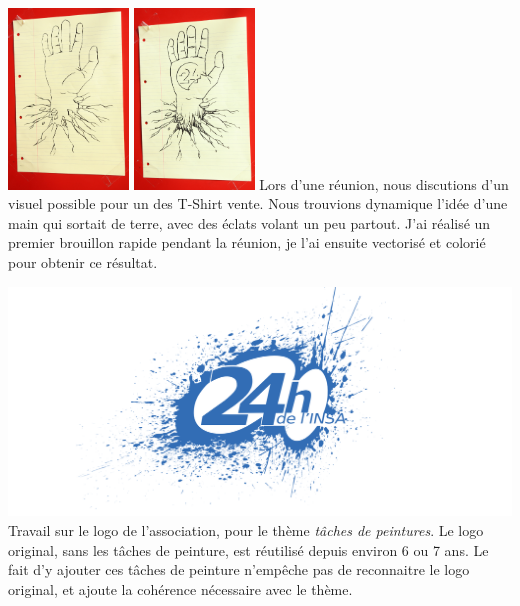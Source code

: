 \begin{center}
                \includegraphics[width=0.24\textwidth]{img/IMG_5792.JPG}
                \includegraphics[width=0.24\textwidth]{img/IMG_5848.JPG}
                Lors d'une réunion, nous discutions d'un visuel possible pour un des T-Shirt vente. Nous trouvions dynamique l'idée d'une main qui sortait de terre, avec des éclats volant un peu partout.
                J'ai réalisé un premier brouillon rapide pendant la réunion, je l'ai ensuite vectorisé et colorié pour obtenir ce résultat.
            \end{center}
            
            \begin{center}                     
                \includegraphics[width=\textwidth]{img/splash24.png}
                Travail sur le logo de l'association, pour le thème \textit{tâches de peintures}.
                Le logo original, sans les tâches de peinture, est réutilisé depuis environ 6 ou 7 ans.
                Le fait d'y ajouter ces tâches de peinture n'empêche pas de reconnaitre le logo original, et ajoute la cohérence nécessaire avec le thème.
            \end{center}
                        
